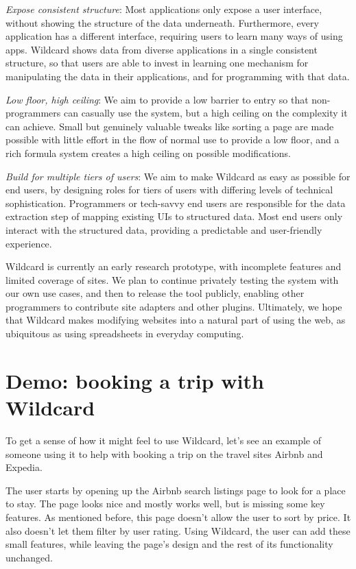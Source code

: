 \documentclass[english,submission]{programming}
\begin{document}
\emph{Expose consistent structure}: Most applications only expose a user
interface, without showing the structure of the data underneath.
Furthermore, every application has a different interface, requiring
users to learn many ways of using apps. Wildcard shows data from diverse
applications in a single consistent structure, so that users are able to
invest in learning one mechanism for manipulating the data in their
applications, and for programming with that data.

\emph{Low floor, high ceiling}: We aim to provide a low barrier to entry
so that non-programmers can casually use the system, but a high ceiling
on the complexity it can achieve. Small but genuinely valuable tweaks
like sorting a page are made possible with little effort in the flow of
normal use to provide a low floor, and a rich formula system creates a
high ceiling on possible modifications.

\emph{Build for multiple tiers of users}: We aim to make Wildcard as
easy as possible for end users, by designing roles for tiers of users
with differing levels of technical sophistication. Programmers or
tech-savvy end users are responsible for the data extraction step of
mapping existing UIs to structured data. Most end users only interact
with the structured data, providing a predictable and user-friendly
experience.

Wildcard is currently an early research prototype, with incomplete
features and limited coverage of sites. We plan to continue privately
testing the system with our own use cases, and then to release the tool
publicly, enabling other programmers to contribute site adapters and
other plugins. Ultimately, we hope that Wildcard makes modifying
websites into a natural part of using the web, as ubiquitous as using
spreadsheets in everyday computing.

\hypertarget{demo-booking-a-trip-with-wildcard}{%
\section{Demo: booking a trip with
Wildcard}\label{demo-booking-a-trip-with-wildcard}}

To get a sense of how it might feel to use Wildcard, let's see an
example of someone using it to help with booking a trip on the travel
sites Airbnb and Expedia.

The user starts by opening up the Airbnb search listings page to look
for a place to stay. The page looks nice and mostly works well, but is
missing some key features. As mentioned before, this page doesn't allow
the user to sort by price. It also doesn't let them filter by user
rating. Using Wildcard, the user can add these small features, while
leaving the page's design and the rest of its functionality unchanged.
\end{document}
